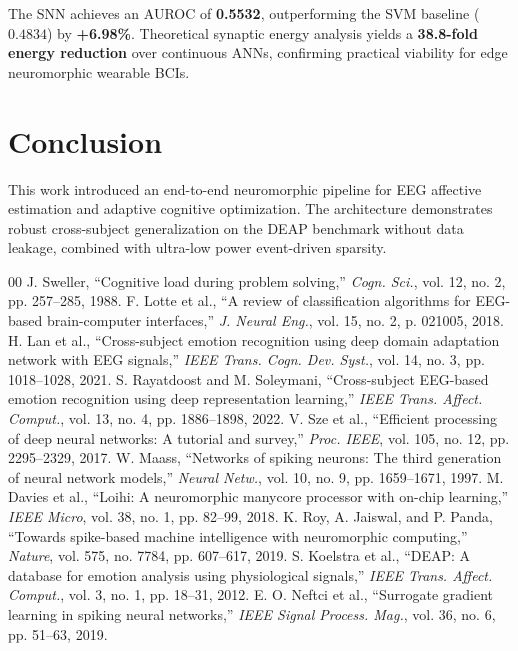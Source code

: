 \documentclass[journal]{IEEEtran}
\begin{document}
The SNN achieves an AUROC of \textbf{0.5532}, outperforming the SVM baseline ($0.4834$) by \textbf{+6.98\%}. Theoretical synaptic energy analysis yields a \textbf{38.8-fold energy reduction} over continuous ANNs, confirming practical viability for edge neuromorphic wearable BCIs.

\section{Conclusion}
This work introduced an end-to-end neuromorphic pipeline for EEG affective estimation and adaptive cognitive optimization. The architecture demonstrates robust cross-subject generalization on the DEAP benchmark without data leakage, combined with ultra-low power event-driven sparsity.

\begin{thebibliography}{00}
 J. Sweller, ``Cognitive load during problem solving,'' \emph{Cogn. Sci.}, vol. 12, no. 2, pp. 257--285, 1988.
 F. Lotte et al., ``A review of classification algorithms for EEG-based brain-computer interfaces,'' \emph{J. Neural Eng.}, vol. 15, no. 2, p. 021005, 2018.
 H. Lan et al., ``Cross-subject emotion recognition using deep domain adaptation network with EEG signals,'' \emph{IEEE Trans. Cogn. Dev. Syst.}, vol. 14, no. 3, pp. 1018--1028, 2021.
 S. Rayatdoost and M. Soleymani, ``Cross-subject EEG-based emotion recognition using deep representation learning,'' \emph{IEEE Trans. Affect. Comput.}, vol. 13, no. 4, pp. 1886--1898, 2022.
 V. Sze et al., ``Efficient processing of deep neural networks: A tutorial and survey,'' \emph{Proc. IEEE}, vol. 105, no. 12, pp. 2295--2329, 2017.
 W. Maass, ``Networks of spiking neurons: The third generation of neural network models,'' \emph{Neural Netw.}, vol. 10, no. 9, pp. 1659--1671, 1997.
 M. Davies et al., ``Loihi: A neuromorphic manycore processor with on-chip learning,'' \emph{IEEE Micro}, vol. 38, no. 1, pp. 82--99, 2018.
 K. Roy, A. Jaiswal, and P. Panda, ``Towards spike-based machine intelligence with neuromorphic computing,'' \emph{Nature}, vol. 575, no. 7784, pp. 607--617, 2019.
 S. Koelstra et al., ``DEAP: A database for emotion analysis using physiological signals,'' \emph{IEEE Trans. Affect. Comput.}, vol. 3, no. 1, pp. 18--31, 2012.
 E. O. Neftci et al., ``Surrogate gradient learning in spiking neural networks,'' \emph{IEEE Signal Process. Mag.}, vol. 36, no. 6, pp. 51--63, 2019.
\end{thebibliography}
\end{document}
